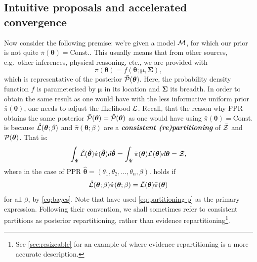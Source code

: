 \documentclass[usenatbib]{mnras}
\begin{document}
\subsection{Intuitive proposals and accelerated convergence\label{sec:accelerating}}
Now consider the following premise: we're given a model \({\cal M}\),
for which our prior is not quite
\(\bar{\pi}(\bm{\theta}) = \text{Const.}\). This usually means that
from other sources, e.g.~other inferences, physical reasoning, etc.,
we are provided with
\begin{equation}
  \pi (\bm{\theta}) = f(\bm{\theta}; \bm{\mu}, \bm{\Sigma}),
 \label{eq:bias}
\end{equation}
which is representative of the posterior
\(\bar{\cal P}(\bm{\theta})\). Here, the probability density function
$f$ is parameterised by \(\bm{\mu}\) in its location and
\(\bm{\Sigma}\) its breadth. In order to obtain the same result as one
would have with the less informative uniform prior
\(\bar{\pi}(\bm{\theta})\), one needs to adjust the likelihood
${\cal L}$. Recall, that the reason why PPR obtains the same posterior
\( \bar{\cal P}(\bm{\theta})= \hat{\cal P}(\bm{\theta})\) as one would
have using \( \bar{\pi} (\bm{\theta}) = \text{Const.}\) is because
\( \hat{\cal L} (\bm{\theta};\beta)\) and
\( \hat{\pi} (\bm{\theta};\beta)\) are a \textbf{\emph{consistent
  (re)partitioning}} of \( \bar{\cal Z}\) and
\({\cal P}(\bm{\theta})\). That is:
\begin{equation}
  \label{eq:partitioning}
  \int_{\Psi} \hat{\cal L} (\hat{\bm{\theta}}) \hat{\pi} (\bm{\hat{\theta}}) d\hat{\bm{\theta}}  = \int_{\Psi}\bar{\pi} (\bm{\theta}) \bar{\cal L} (\bm{\theta}) d\bm{\theta} = \bar{\cal Z}, 
\end{equation}
where in the case of PPR
$\hat{\bm{\theta}} = (\theta_{1}, \theta_{2}, \ldots, \theta_{n},
\beta)$.  holds if
\begin{equation}
  \label{eq:partitioning-p}
  \hat{\cal L}(\bm{\theta};\beta) \hat{\pi}(\bm{\theta};\beta)  = \bar{\cal L}(\bm{\theta})\bar{\pi}(\bm{\theta}) 
\end{equation}
for all $\beta$, by \cref{eq:bayes}. Note that
\cite{chen-ferroz-hobson} have used \cref{eq:partitioning-p} as the
primary expression. Following their convention, we shall sometimes
refer to consistent partitions as posterior repartitioning, rather
than evidence repartitioning\footnote{See \cref{sec:resizeable} for an
  example of where evidence repartitioning is a more accurate
  description.}.
\end{document}
